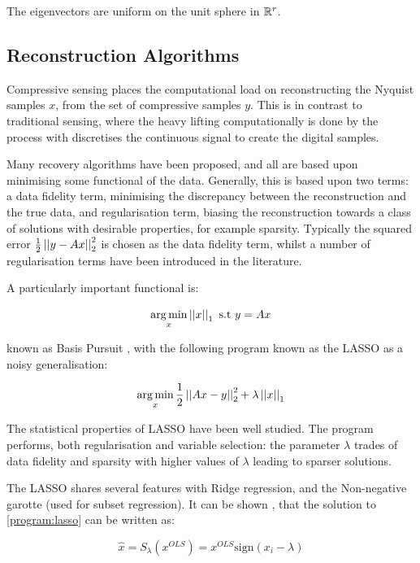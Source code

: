 \documentclass[12pt]{report}
\begin{document}
The eigenvectors are uniform on the unit sphere in \({\mathbb{R}}^{r}\).

\subsection{Reconstruction Algorithms}
Compressive sensing places the computational load on reconstructing the Nyquist samples \(x\), from the set of compressive samples \(y\). This is in contrast to traditional sensing, where the heavy lifting computationally is done by the process with discretises the continuous signal to create the digital samples. 

Many recovery algorithms have been proposed, and all are based upon minimising some functional of the data. Generally, this is based upon two terms: a data fidelity term, minimising the discrepancy between the reconstruction and the true data, and regularisation term, biasing the reconstruction towards a class of solutions with desirable properties, for example sparsity. Typically the squared error \( \frac{1}{2}\left|\left|y-Ax\right|\right|_2^2 \) is chosen as the data fidelity term, whilst a number of regularisation terms have been introduced in the literature. 

A particularly important functional is:

\begin{equation}
\operatorname*{arg\,min}_x \left|\left|x\right|\right|_1 \text{ s.t } y=Ax
\label{program:bp}
\end{equation}

known as Basis Pursuit \cite{Chen1998a}, with the following program known as the LASSO \cite{tibshirani1996regression} as a noisy generalisation: 

\begin{equation}
\operatorname*{arg\,min}_x \frac{1}{2}\left|\left|Ax-y\right|\right|_2^2 + \lambda\left|\left|x\right|\right|_1
\label{program:lasso}
\end{equation}

The statistical properties of LASSO have been well studied. The program performs, both regularisation and variable selection: the parameter \(\lambda\) trades of data fidelity and sparsity with higher values of \(\lambda\) leading to sparser solutions. 

The LASSO shares several features with Ridge regression, and the Non-negative garotte (used for subset regression). It can be shown \cite{hastie2005elements}, that the solution to \eqref{program:lasso} can be written as:

\begin{equation}
\hat{x} = S_{\lambda}\left(x^{OLS}\right) = x^{OLS} \mathrm{sign}\left(x_i - \lambda\right)
\label{soln:lasso}
\end{equation} 
\end{document}
